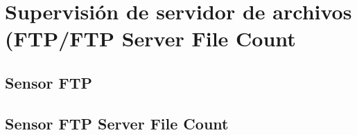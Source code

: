 \section{Supervisión de servidor de archivos (FTP/FTP Server File Count}
\subsection{Sensor FTP}
\subsection{Sensor FTP Server File Count}